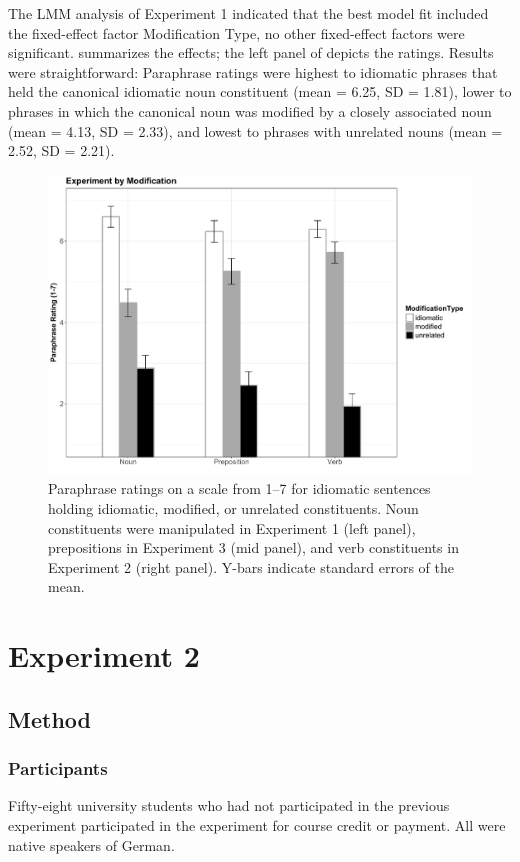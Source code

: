 \documentclass[output=paper]{langsci/langscibook}
\begin{document}
The LMM analysis of Experiment 1 indicated that the best model fit included the fixed-effect factor Modification Type, no other fixed-effect factors were significant.   summarizes the effects; the left panel of  depicts the ratings. Results were straightforward: Paraphrase ratings were highest to idiomatic phrases that held the canonical idiomatic noun constituent (mean = 6.25, SD = 1.81), lower to phrases in which the canonical noun was modified by a closely associated noun (mean = 4.13, SD = 2.33), and lowest to phrases with unrelated nouns (mean = 2.52, SD = 2.21).

\begin{figure}
  \includegraphics[width=\linewidth]{figures/smolka.pdf}
  \caption{Paraphrase ratings on a scale from 1--7 for idiomatic sentences holding idiomatic, modified, or unrelated constituents. Noun constituents were manipulated in Experiment 1 (left panel), prepositions in Experiment 3 (mid panel), and verb constituents in Experiment 2 (right panel). Y-bars indicate standard errors of the mean.}
  \label{fig:chart}
\end{figure}



\section{Experiment 2}

\subsection{Method}

\subsubsection{Participants}
Fifty-eight university students who had not participated in the previous experiment participated in the experiment for course credit or payment. All were native speakers of German. 
\end{document}
